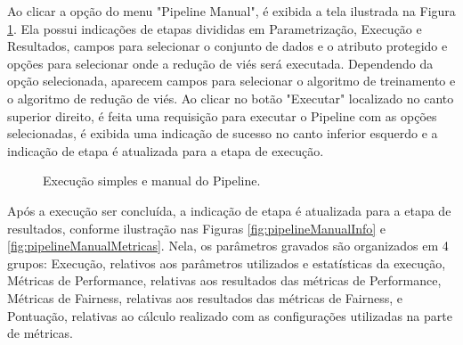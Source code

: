 \documentclass[portugues]{ic-tese}
\begin{document}
Ao clicar a opção do menu "Pipeline Manual", é exibida a tela ilustrada na Figura \ref{fig:pipelineManual}. Ela possui indicações de etapas divididas em Parametrização, Execução e Resultados, campos para selecionar o conjunto de dados e o atributo protegido e opções para selecionar onde a redução de viés será executada. Dependendo da opção selecionada, aparecem campos para selecionar o algoritmo de treinamento e o algoritmo de redução de viés. Ao clicar no botão "Executar" localizado no canto superior direito, é feita uma requisição para executar o Pipeline com as opções selecionadas, é exibida uma indicação de sucesso no canto inferior esquerdo e a indicação de etapa é atualizada para a etapa de execução.

\begin{figure}[H]
    \centering
    \caption{Execução simples e manual do Pipeline.}
    \label{fig:pipelineManual}
\end{figure}

Após a execução ser concluída,  a indicação de etapa é atualizada para a etapa de resultados, conforme ilustração nas Figuras \ref{fig:pipelineManualInfo} e \ref{fig:pipelineManualMetricas}. Nela, os parâmetros gravados são organizados em 4 grupos: Execução, relativos aos parâmetros utilizados e estatísticas da execução, Métricas de Performance, relativas aos resultados das métricas de Performance, Métricas de Fairness, relativas aos resultados das métricas de Fairness, e Pontuação, relativas ao cálculo realizado com as configurações utilizadas na parte de métricas.
\end{document}
